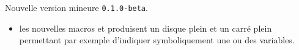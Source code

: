 Nouvelle version mineure \verb+0.1.0-beta+.

\begin{itemize}[itemsep=.5em]
    \item {} les nouvelles macros  et  produisent un disque plein et un carré plein permettant par exemple d'indiquer symboliquement une ou des variables.
    
    \separation
\end{itemize}